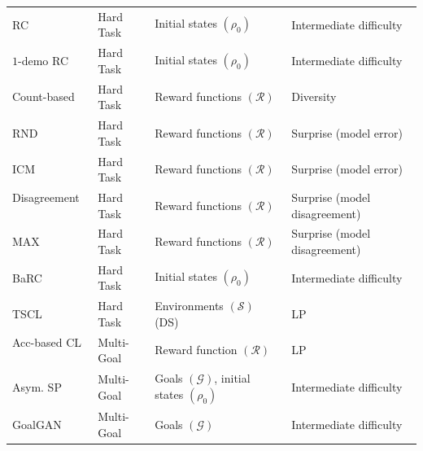 \documentclass{article}
\begin{document}
\begin{table}[htb!]
\begin{tabular}{llll}
RC ~\cite{reverse-cur}                &  Hard Task   & Initial states $(\rho_0)$         & Intermediate difficulty                  \\
$1$-demo RC~\cite{montezuma-single-demo}               &   Hard Task              & Initial states $(\rho_0)$              & Intermediate difficulty                  \\
 Count-based ~\cite{countbased}                   &  Hard Task                   & Reward functions $(\mathcal{R})$                  & Diversity              \\
  RND ~\cite{rnd}                                 &  Hard Task                   & Reward functions $(\mathcal{R})$                  & Surprise (model error)              \\
 ICM ~\cite{icm}                                  &  Hard Task                   & Reward functions $(\mathcal{R})$                  & Surprise (model error)              \\
 Disagreement ~\cite{pathakdisagreement}          &  Hard Task                   & Reward functions  $(\mathcal{R})$                 & Surprise (model disagreement)              \\
 MAX ~\cite{disagreement}                &  Hard Task                   & Reward functions  $(\mathcal{R})$                & Surprise (model disagreement)              \\

BaRC ~\cite{BaRC}                                &   Hard Task              & Initial states $(\rho_0)$              & Intermediate difficulty                  \\

 TSCL ~\cite{tscl}                                & Hard Task                 & Environments $(\mathcal{S})$ (DS)            & LP                       \\
 
  Acc-based CL ~\cite{fournier-accuracy-acl}       & Multi-Goal        & Reward function $(\mathcal{R})$            & LP                      \\

 
Asym. SP ~\cite{asymetricSP}                     &  Multi-Goal     & Goals $(\mathcal{G})$, initial states $(\rho_0)$   & Intermediate difficulty   \\
   
GoalGAN ~\cite{goalgan}                          &   Multi-Goal      & Goals  $(\mathcal{G})$            & Intermediate difficulty             \\
 

\end{tabular}
\end{table}
\end{document}
